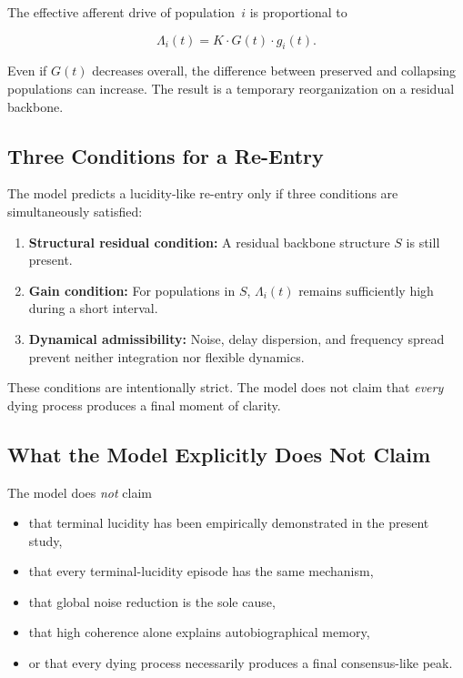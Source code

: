 \documentclass[11pt,a4paper]{article}
\theoremstyle{plain}
\theoremstyle{definition}
\theoremstyle{remark}
\begin{document}
The effective afferent drive of population~$i$ is proportional to

\begin{equation}
\label{eq:Lambda}
\Lambda_i(t) = K \cdot G(t) \cdot g_i(t).
\end{equation}

Even if $G(t)$ decreases overall, the difference between preserved and collapsing populations can increase. The result is a temporary reorganization on a residual backbone.

\subsection{Three Conditions for a Re-Entry}

The model predicts a lucidity-like re-entry only if three conditions are simultaneously satisfied:

\begin{enumerate}
\item \textbf{Structural residual condition:} A residual backbone structure $S$ is still present.
\item \textbf{Gain condition:} For populations in $S$, $\Lambda_i(t)$ remains sufficiently high during a short interval.
\item \textbf{Dynamical admissibility:} Noise, delay dispersion, and frequency spread prevent neither integration nor flexible dynamics.
\end{enumerate}

These conditions are intentionally strict. The model does not claim that \emph{every} dying process produces a final moment of clarity.

\subsection{What the Model Explicitly Does Not Claim}

The model does \emph{not} claim
\begin{itemize}
\item that terminal lucidity has been empirically demonstrated in the present study,
\item that every terminal-lucidity episode has the same mechanism,
\item that global noise reduction is the sole cause,
\item that high coherence alone explains autobiographical memory,
\item or that every dying process necessarily produces a final consensus-like peak.
\end{itemize}
\end{document}
